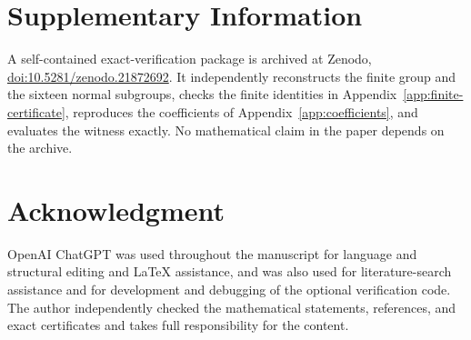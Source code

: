\documentclass[journal]{IEEEtran}
\begin{document}
\section*{Supplementary Information}
A self-contained exact-verification package is archived at Zenodo,
\href{https://doi.org/10.5281/zenodo.21872692}{doi:10.5281/zenodo.21872692}.
It independently reconstructs the finite group and the sixteen normal subgroups,
checks the finite identities in Appendix~\ref{app:finite-certificate}, reproduces
the coefficients of Appendix~\ref{app:coefficients}, and evaluates the witness
exactly.  No mathematical claim in the paper depends on the archive.

\section*{Acknowledgment}
OpenAI ChatGPT was used throughout the manuscript for language and structural
editing and LaTeX assistance, and was also used for literature-search assistance
and for development and debugging of the optional verification code.  The author
independently checked the mathematical statements, references, and exact
certificates and takes full responsibility for the content.
\end{document}
